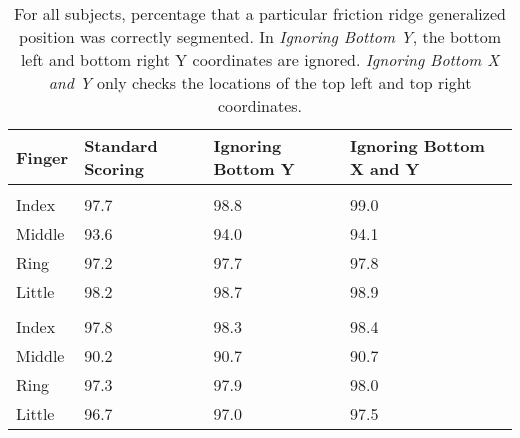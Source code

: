 \documentclass[]{article}
\begin{document}
\begin{table}[!h]

\caption{\label{tab:twoinch-per-frgp}For all subjects, percentage that a particular friction ridge generalized position was correctly segmented. In \textit{Ignoring Bottom Y}, the bottom left and bottom right Y coordinates are ignored. \textit{Ignoring Bottom X and Y} only checks the locations of the top left and top right coordinates.}
\centering
\begin{tabular}{llll}
\toprule
Finger & Standard Scoring & Ignoring Bottom Y & Ignoring Bottom X and Y\\
\midrule
\addlinespace[0.3em]
\multicolumn{4}{l}{\textbf{Right}}\\
\rowcolor{gray!6}  \hspace{1em}Index & 97.7 & 98.8 & 99.0\\
\hspace{1em}Middle & 93.6 & 94.0 & 94.1\\
\rowcolor{gray!6}  \hspace{1em}Ring & 97.2 & 97.7 & 97.8\\
\hspace{1em}Little & 98.2 & 98.7 & 98.9\\
\addlinespace[0.3em]
\multicolumn{4}{l}{\textbf{Left}}\\
\rowcolor{gray!6}  \hspace{1em}Index & 97.8 & 98.3 & 98.4\\
\hspace{1em}Middle & 90.2 & 90.7 & 90.7\\
\rowcolor{gray!6}  \hspace{1em}Ring & 97.3 & 97.9 & 98.0\\
\hspace{1em}Little & 96.7 & 97.0 & 97.5\\
\bottomrule
\end{tabular}
\end{table}
\end{document}
